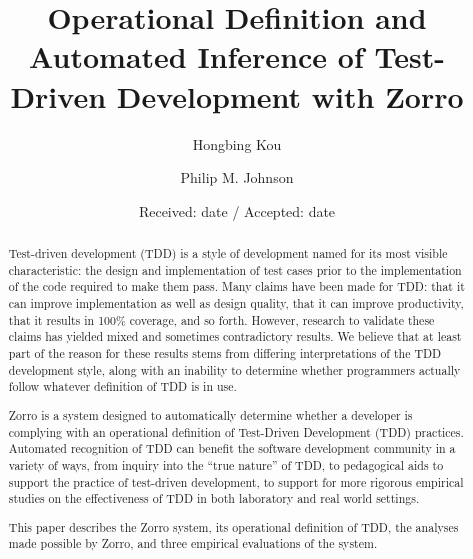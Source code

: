 \documentclass[smallextended]{svjour3}     %
\begin{document}
\title{Operational Definition and Automated Inference of Test-Driven Development with Zorro}
\author{Hongbing Kou \and Philip M. Johnson}

\date{Received: date / Accepted: date}

\maketitle

\begin{abstract}

Test-driven development (TDD) is a style of development named for its most
visible characteristic: the design and implementation of test cases prior
to the implementation of the code required to make them pass. Many claims
have been made for TDD: that it can improve implementation as well as
design quality, that it can improve productivity, that it results in 100\%
coverage, and so forth.  However, research to validate these claims has
yielded mixed and sometimes contradictory results.  We believe that at
least part of the reason for these results stems from differing
interpretations of the TDD development style, along with an inability to
determine whether programmers actually follow whatever definition of
TDD is in use.

Zorro is a system designed to automatically determine whether a developer
is complying with an operational definition of Test-Driven Development
(TDD) practices.  Automated recognition of TDD can benefit the software
development community in a variety of ways, from inquiry into the ``true
nature'' of TDD, to pedagogical aids to support the practice of test-driven
development, to support for more rigorous empirical studies on the
effectiveness of TDD in both laboratory and real world settings.

This paper describes the Zorro system, its operational definition of TDD,
the analyses made possible by Zorro, and three empirical evaluations of the
system.


\end{abstract}
\end{document}

